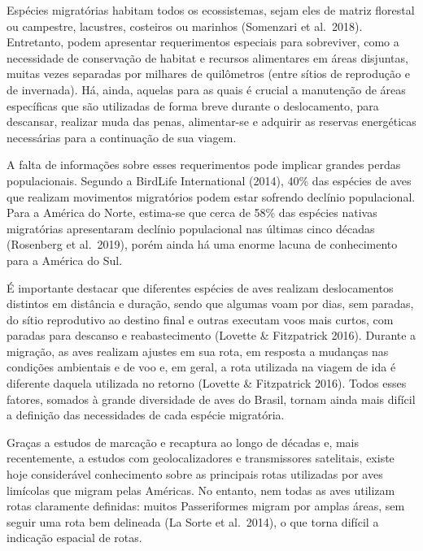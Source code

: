 \documentclass[
  oneside]{scrbook}
\begin{document}
Espécies migratórias habitam todos os ecossistemas, sejam eles de matriz florestal ou campestre, lacustres, costeiros ou marinhos (Somenzari et al.~2018). Entretanto, podem apresentar requerimentos especiais para sobreviver, como a necessidade de conservação de habitat e recursos alimentares em áreas disjuntas, muitas vezes separadas por milhares de quilômetros (entre sítios de reprodução e de invernada). Há, ainda, aquelas para as quais é crucial a manutenção de áreas específicas que são utilizadas de forma breve durante o deslocamento, para descansar, realizar muda das penas, alimentar-se e adquirir as reservas energéticas necessárias para a continuação de sua viagem.

A falta de informações sobre esses requerimentos pode implicar grandes perdas populacionais. Segundo a BirdLife International (2014), 40\% das espécies de aves que realizam movimentos migratórios podem estar sofrendo declínio populacional. Para a América do Norte, estima-se que cerca de 58\% das espécies nativas migratórias apresentaram declínio populacional nas últimas cinco décadas (Rosenberg et al.~2019), porém ainda há uma enorme lacuna de conhecimento para a América do Sul.

É importante destacar que diferentes espécies de aves realizam deslocamentos distintos em distância e duração, sendo que algumas voam por dias, sem paradas, do sítio reprodutivo ao destino final e outras executam voos mais curtos, com paradas para descanso e reabastecimento (Lovette \& Fitzpatrick 2016). Durante a migração, as aves realizam ajustes em sua rota, em resposta a mudanças nas condições ambientais e de voo e, em geral, a rota utilizada na viagem de ida é diferente daquela utilizada no retorno (Lovette \& Fitzpatrick 2016). Todos esses fatores, somados à grande diversidade de aves do Brasil, tornam ainda mais difícil a definição das necessidades de cada espécie migratória.

Graças a estudos de marcação e recaptura ao longo de décadas e, mais recentemente, a estudos com geolocalizadores e transmissores satelitais, existe hoje considerável conhecimento sobre as principais rotas utilizadas por aves limícolas que migram pelas Américas. No entanto, nem todas as aves utilizam rotas claramente definidas: muitos Passeriformes migram por amplas áreas, sem seguir uma rota bem delineada (La Sorte et al.~2014), o que torna difícil a indicação espacial de rotas.
\end{document}
